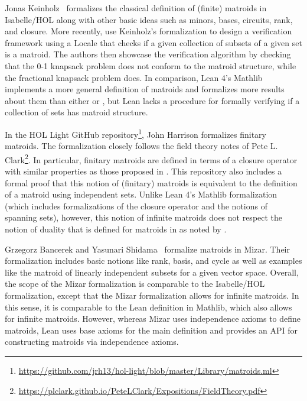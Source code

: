 Jonas Keinholz~\cite{Matroids-AFP} formalizes the classical definition of (finite) matroids \cite{Oxley2011, Truemper2016} in Isabelle/HOL along with other basic ideas such as minors, bases, circuits, rank, and closure. 
More recently, \citeauthor{Wan2025} use Keinholz's formalization to design a verification framework using a Locale that checks if a given collection of subsets of a given set is a matroid. The authors then showcase the verification algorithm by checking that the 0-1 knapsack problem does not conform to the matroid structure, while the fractional knapsack problem does. In comparison, Lean 4's Mathlib implements a more general definition of matroids and formalizes more results about them than either \citeauthor{Matroids-AFP} or \citeauthor{Wan2025}, but Lean lacks a procedure for formally verifying if a collection of sets has matroid structure. %

In the HOL Light GitHub repository\footnote{\url{https://github.com/jrh13/hol-light/blob/master/Library/matroids.ml}}, John Harrison formalizes finitary matroids. The formalization closely follows the field theory notes of Pete L. Clark\footnote{\url{https://plclark.github.io/PeteLClark/Expositions/FieldTheory.pdf}}. In particular, finitary matroids are defined in terms of a closure operator with similar properties as those proposed in \cite{Bruhn2013}. This repository also includes a formal proof that this notion of (finitary) matroids is equivalent to the definition of a matroid using independent sets. Unlike Lean 4's Mathlib formalization (which includes formalizations of the closure operator and the notions of spanning sets), however, this notion of infinite matroids does not respect the notion of duality that is defined for matroids in \cite{Oxley2011,Truemper2016} as noted by \citeauthor{Bruhn2013}.

Grzegorz Bancerek and Yasunari Shidama~\cite{matroid0} formalize matroids in Mizar. Their formalization includes basic notions like rank, basis, and cycle as well as examples like the matroid of linearly independent subsets for a given vector space. Overall, the scope of the Mizar formalization is comparable to the Isabelle/HOL formalization, except that the Mizar formalization allows for infinite matroids. In this sense, it is comparable to the Lean definition in Mathlib, which also allows for infinite matroids. However, whereas Mizar uses independence axioms to define matroids, Lean uses base axioms for the main definition and provides an API for constructing matroids via independence axioms.
